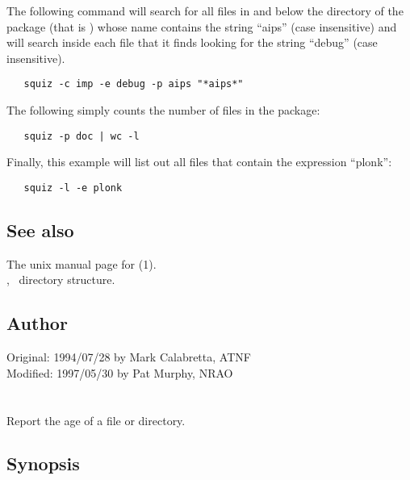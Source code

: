 The following command will search for all files in and below the
 directory of the  package (that is
) whose name contains the string ``aips'' (case
insensitive) and will search inside each file that it finds looking for the
string ``debug'' (case insensitive).

\begin{verbatim}
   squiz -c imp -e debug -p aips "*aips*"
\end{verbatim}

\noindent
The following simply counts the number of files in the  package:

\begin{verbatim}
   squiz -p doc | wc -l
\end{verbatim}

\noindent
Finally, this example will list out all files that contain the expression
``plonk'':

\begin{verbatim}
   squiz -l -e plonk
\end{verbatim}

\subsection*{See also}

The unix manual page for (1).\\
, \aipspp\ directory structure.

\subsection*{Author}

Original: 1994/07/28 by Mark Calabretta, ATNF\\
Modified: 1997/05/30 by Pat Murphy, NRAO


\newpage
\section{}
\label{tract}

Report the age of a file or directory.

\subsection*{Synopsis}

